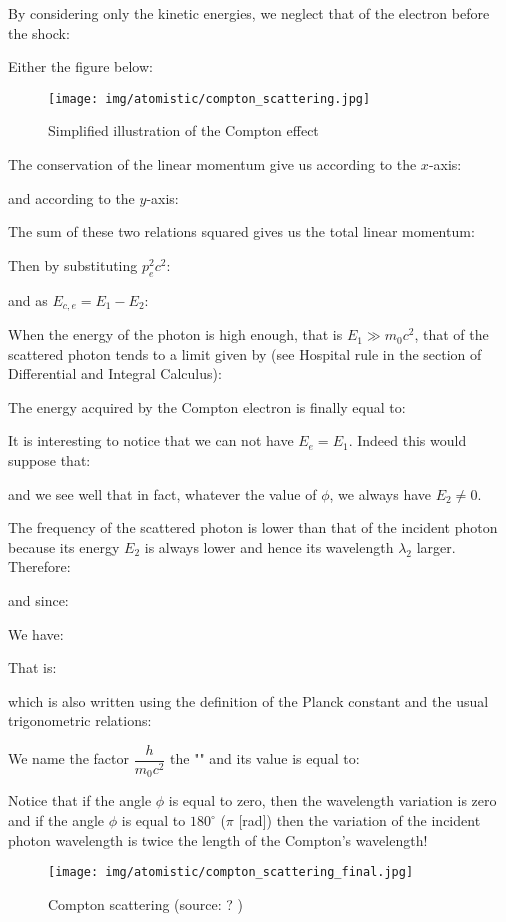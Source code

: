 	By considering only the kinetic energies, we neglect that of the electron before the shock:
	
	Either the figure below:
	\begin{figure}[H]
		\centering
		\texttt{[image: img/atomistic/compton\_scattering.jpg]}
		\caption[]{Simplified illustration of the Compton effect}
	\end{figure}
	The conservation of the linear momentum give us according to the $x$-axis:
	
	and according to the $y$-axis:
	
	The sum of these two relations squared gives us the total linear momentum:
	
	Then by substituting $p_e^2c^2$:
	
	and as $E_{c,e}=E_1-E_2$:
	
	When the energy of the photon is high enough, that is $E_1\gg m_0c^2$, that of the scattered photon tends to a limit given by (see Hospital rule in the section of Differential and Integral Calculus):
	
	The energy acquired by the Compton electron is finally equal to:
	
	It is interesting to notice that we can not have $E_e=E_1$. Indeed this would suppose that:
	
	and we see well that in fact, whatever the value of $\phi$, we always have $E_2\neq 0$.
	
	The frequency of the scattered photon is lower than that of the incident photon because its energy $E_2$ is always lower and hence its wavelength $\lambda_2$ larger. Therefore:
	
	and since:
	
	We have:
	
	That is:
	
	which is also written using the definition of the Planck constant and the usual trigonometric relations:
	
	We name the factor $\dfrac{h}{m_0c^2}$ the "" and its value is equal to:
	
	Notice that if the angle $\phi$ is equal to zero, then the wavelength variation is zero and if the angle $\phi$ is equal to $180^\circ$ ($\pi$ [rad]) then the variation of the incident photon wavelength is twice the length of the Compton's wavelength!
	
	\begin{figure}[H]
		\centering
		\texttt{[image: img/atomistic/compton\_scattering\_final.jpg]}
		\caption{Compton scattering (source: ? )}
	\end{figure}
	
